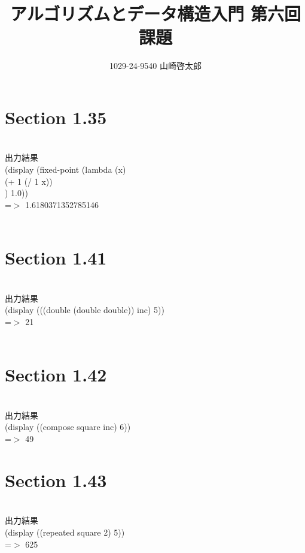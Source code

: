 ﻿\documentclass[a4paper,12pt]{article}
\title{アルゴリズムとデータ構造入門 第六回課題}
\author{1029-24-9540 山崎啓太郎}
\begin{document}
\maketitle

\section{Section 1.35}
\lstset{numbers=left,basicstyle=\small}

\\
\large{出力結果}\\
(display (fixed-point (lambda (x) \\
	(+ 1 (/ 1 x))\\
) 1.0))\\
=$>$ 1.6180371352785146\\
\\
\section{Section 1.41}
\lstset{numbers=left,basicstyle=\small}

\\
\large{出力結果}\\
(display (((double (double double)) inc) 5))\\
=$>$ 21\\
\\
\section{Section 1.42}
\lstset{numbers=left,basicstyle=\small}

\\
\large{出力結果}\\
(display ((compose square inc) 6))\\
=$>$ 49
\\
\section{Section 1.43}
\lstset{numbers=left,basicstyle=\small}

\\
\large{出力結果}\\
(display ((repeated square 2) 5))\\
=$>$ 625\\
\\
\end{document}
